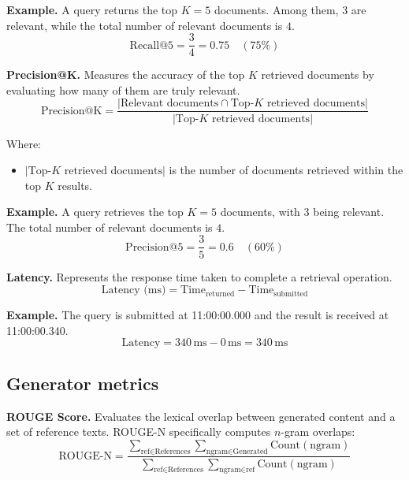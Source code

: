 	\textbf{Example.} A query returns the top \( K = 5 \) documents. Among them, \( 3 \) are relevant, while the total number of relevant documents is \( 4 \).
	\begin{equation*}
		\text{Recall@5} = \frac{3}{4} = 0.75 \quad (75\%)
	\end{equation*}
	
	\noindent\textbf{Precision@K.} Measures the accuracy of the top $K$ retrieved documents by evaluating how many of them are truly relevant.
	\[
	\text{Precision@K} = \frac{| \text{Relevant documents} \cap \text{Top-}K \text{ retrieved documents} |}{|\text{Top-}K \text{ retrieved documents}|}
	\]
	
	Where:
	\begin{itemize}
		\item $|\text{Top-}K \text{ retrieved documents}|$ is the number of documents retrieved within the top $K$ results.
	\end{itemize}
	
	\textbf{Example.} A query retrieves the top \( K = 5 \) documents, with \( 3 \) being relevant. The total number of relevant documents is \( 4 \).
	\begin{equation*}
		\text{Precision@5} = \frac{3}{5} = 0.6 \quad (60\%)
	\end{equation*}
	
	\noindent\textbf{Latency.} Represents the response time taken to complete a retrieval operation.
	\[
	\text{Latency (ms)} = \text{Time}_{\text{returned}} - \text{Time}_{\text{submitted}}
	\]
	
	\textbf{Example.} The query is submitted at 11:00:00.000 and the result is received at 11:00:00.340.
	\begin{equation*}
		\text{Latency} = 340\,\text{ms} - 0\,\text{ms} = 340\,\text{ms}
	\end{equation*}
	
	\subsection{Generator metrics}
	
	\noindent\textbf{ROUGE Score.} Evaluates the lexical overlap between generated content and a set of reference texts. ROUGE-N specifically computes $n$-gram overlaps:
	\[
	\text{ROUGE-N} = \frac{\sum_{\text{ref} \in \text{References}} \sum_{\text{ngram} \in \text{Generated}} \text{Count}(\text{ngram})}{\sum_{\text{ref} \in \text{References}} \sum_{\text{ngram} \in \text{ref}} \text{Count}(\text{ngram})}
	\]
	
